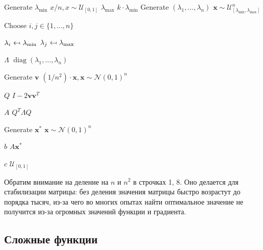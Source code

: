 \documentclass[12pt]{article}
\begin{document}
\begin{algorithm}[H]
\DontPrintSemicolon

    Generate $\lambda_{\min}$  $x / n, x \sim \mathcal{U}_{[0,1]}$\;
    $\lambda_{\max}$  $k \cdot \lambda_{\min}$\;
    Generate $(\lambda_1,\ldots,\lambda_n)$  $\textbf{x} \sim \mathcal{U}_{[\lambda_{\min}, \lambda_{\max}]}^n$\;

    Choose $i,j \in \{1,\ldots,n\}$\;

    $\lambda_i\ \reflectbox{$\mapsto$}\ \lambda_{\min}$\;
    $\lambda_j\ \reflectbox{$\mapsto$}\ \lambda_{\max}$\;

    $\Lambda$  $\operatorname{diag}(\lambda_1,\ldots,\lambda_n)$\;

    Generate $\textbf{v}$  $(1 / n^2) \cdot \textbf{x}, \textbf{x} \sim \mathcal{N}(0,1)^n$\;

    $Q$  $I - 2\textbf{v}\textbf{v}^T$\;

    $A$  $Q^T \Lambda Q$\;

    Generate $\textbf{x}^*$  $\textbf{x} \sim \mathcal{N}(0,1)^n$\;

    $b$  $A \textbf{x}^*$\;

    $c$  $\mathcal{U}_{[0,1]}$\;

\caption{Генерация случайной квадратичной функции}
\end{algorithm}

Обратим внимание на деление на $n$ и $n^2$ в строчках 1, 8. Оно делается для стабилизации матрицы: без деления значения матрицы быстро возрастут до порядка тысяч, из-за чего во многих опытах найти оптимальное значение не получится из-за огромных значений функции и градиента.

\subsection{Сложные функции}
\end{document}
